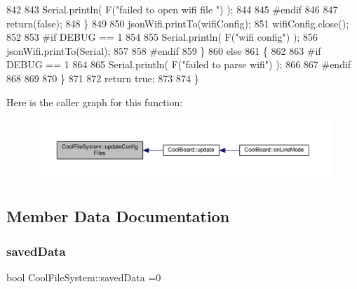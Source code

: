 \begin{DoxyCode}
842 
843             Serial.println( F(\textcolor{stringliteral}{"failed to open wifi file "}) );
844         
845 \textcolor{preprocessor}{        #endif}
846         
847             \textcolor{keywordflow}{return}(\textcolor{keyword}{false});
848         \}
849 
850         jsonWifi.printTo(wifiConfig);
851         wifiConfig.close();
852 
853 \textcolor{preprocessor}{#if DEBUG == 1 }
854 
855         Serial.println( F(\textcolor{stringliteral}{"wifi config"}) );
856         jsonWifi.printTo(Serial);
857 
858 \textcolor{preprocessor}{#endif}
859     \}
860     \textcolor{keywordflow}{else}
861     \{
862 
863 \textcolor{preprocessor}{    #if DEBUG == 1 }
864 
865         Serial.println( F(\textcolor{stringliteral}{"failed to parse wifi"}) );
866     
867 \textcolor{preprocessor}{    #endif}
868 
869     
870     \}   
871         
872     \textcolor{keywordflow}{return} \textcolor{keyword}{true};
873 
874 \}   
\end{DoxyCode}
Here is the caller graph for this function\+:
\nopagebreak
\begin{figure}[H]
\begin{center}
\leavevmode
\includegraphics[width=350pt]{classCoolFileSystem_adfa8e2e80641ae6f0cceabd348a9b841_icgraph}
\end{center}
\end{figure}


\subsection{Member Data Documentation}
\mbox{\label{classCoolFileSystem_ad398e0c5c41a0c88acdf5d672aa71351}} 
\subsubsection{\texorpdfstring{saved\+Data}{savedData}}
{\footnotesize\ttfamily bool Cool\+File\+System\+::saved\+Data =0\hspace{0.3cm}{\ttfamily [private]}}



